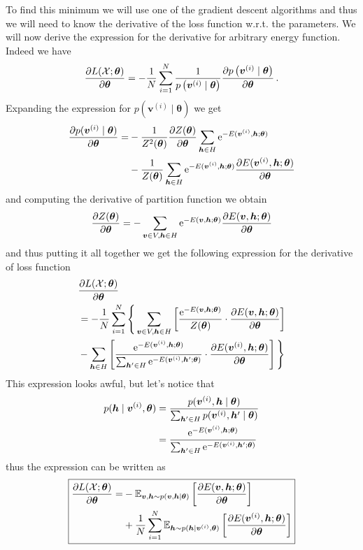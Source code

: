 \documentclass{myclass}
\begin{document}
To find this minimum we will use one of the gradient descent algorithms and thus we will need to
know the derivative of the loss function w.r.t. the parameters. We will now derive the expression
for the derivative for arbitrary energy function. Indeed we have
\[
   \pdv{L(\mathcal{X}; \bm{\theta})}{\bm{\theta}} = - \frac{1}{N} \sum_{i=1}^N \frac{1}{p\left(\bm{v}^{(i)} \mid \bm{\theta}\right)} \pdv{p\left(\bm{v}^{(i)} \mid \bm{\theta}\right)}{\bm{\theta}}\,.
\]
Expanding the expression for \(p(\bm{v}^{(i)} \mid \bm{\theta})\) we get
\[
\begin{split}
   \pdv{p(\bm{v}^{(i)} \mid \bm{\theta})}{\bm{\theta}} = &- \frac{1}{Z^2(\bm{\theta})} \pdv{Z(\bm{\theta})}{\bm{\theta}} \sum_{\bm{h} \in H} \mathrm{e}^{-E(\bm{v}^{(i)},\bm{h};\bm{\theta})}\\
   &-\frac{1}{Z(\bm{\theta})} \sum_{\bm{h} \in H} \mathrm{e}^{-E(\bm{v}^{(i)},\bm{h};\bm{\theta})} \pdv{E(\bm{v}^{(i)},\bm{h};\bm{\theta})}{\bm{\theta}}
\end{split}
\]
and computing the derivative of partition function we obtain
\[
   \pdv{Z(\bm{\theta})}{\bm{\theta}} = -\sum_{\bm{v} \in V, \bm{h} \in H} \mathrm{e}^{-E(\bm{v},\bm{h};\bm{\theta})} \pdv{E(\bm{v},\bm{h};\bm{\theta})}{\bm{\theta}}
\]
and thus putting it all together we get the following expression for the derivative of loss function
\[
\begin{split}
   &\pdv{L(\mathcal{X};\bm{\theta})}{\bm{\theta}} \\
   &= -\frac{1}{N} \sum_{i=1}^N \Bigg\{ \sum_{\bm{v} \in V, \bm{h} \in H} \left[ \frac{\mathrm{e}^{-E(\bm{v},\bm{h};\bm{\theta})}}{Z(\bm{\theta})} \cdot \pdv{E(\bm{v},\bm{h};\bm{\theta})}{\bm{\theta}} \right] \\
   &- \sum_{\bm{h} \in H} \left[ \frac{\mathrm{e}^{-E(\bm{v}^{(i)},\bm{h};\bm{\theta})}}{\sum_{\bm{h}' \in H} \mathrm{e}^{-E(\bm{v}^{(i)},\bm{h}';\bm{\theta})}} \cdot \pdv{E(\bm{v}^{(i)},\bm{h};\bm{\theta})}{\bm{\theta}} \right] 
   \Bigg\}
\end{split}
\]
This expression looks awful, but let's notice that
\[
\begin{split}
   p(\bm{h} \mid \bm{v}^{(i)}, \bm{\theta}) &= \frac{p(\bm{v}^{(i)}, \bm{h} \mid \bm{\theta})}{\sum_{\bm{h}' \in H} p(\bm{v}^{(i)}, \bm{h}' \mid \bm{\theta})}\\
                                      &= \frac{\mathrm{e}^{-E(\bm{v}^{(i)},\bm{h};\bm{\theta})}}{\sum_{\bm{h}' \in H} \mathrm{e}^{-E(\bm{v}^{(i)},\bm{h}';\bm{\theta})}}
\end{split}
\]
thus the expression can be written as
\[
\boxed
{
   \begin{split}
      \pdv{L(\mathcal{X};\bm{\theta})}{\bm{\theta}}= &-\mathbb{E}_{\bm{v},\bm{h} \sim p(\bm{v},\bm{h} \mid \bm{\theta})} \left[ \pdv{E(\bm{v},\bm{h};\bm{\theta})}{\bm{\theta}} \right] \\
      &+ \frac{1}{N} \sum_{i=1}^N \mathbb{E}_{\bm{h} \sim p(\bm{h} \mid \bm{v}^{(i)}, \bm{\theta})} \left[ \pdv{E(\bm{v}^{(i)}, \bm{h}; \bm{\theta})}{\bm{\theta}} \right]
   \end{split}
}
\]
\end{document}
